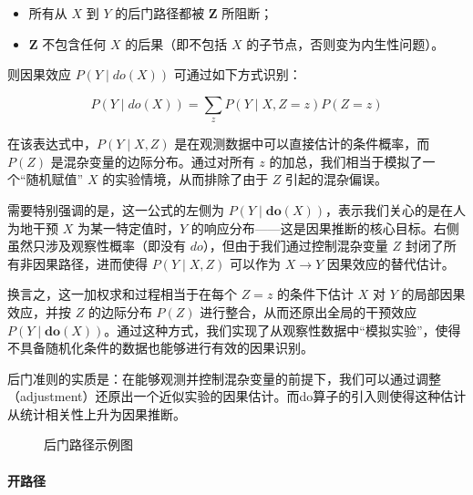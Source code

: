 \begin{itemize}
	\item 所有从 $X$ 到 $Y$ 的后门路径都被 $\mathbf{Z}$ 所阻断；
	\item $\mathbf{Z}$ 不包含任何 $X$ 的后果（即不包括 $X$ 的子节点，否则变为内生性问题）。
\end{itemize}

则因果效应 $P(Y \mid do(X))$ 可通过如下方式识别：

\begin{equation}
P(Y \mid do(X)) = \sum_{z} P(Y \mid X, Z = z) P(Z = z)
\end{equation}

在该表达式中，$P(Y \mid X, Z)$ 是在观测数据中可以直接估计的条件概率，而 $P(Z)$ 是混杂变量的边际分布。通过对所有 $z$ 的加总，我们相当于模拟了一个“随机赋值” $X$ 的实验情境，从而排除了由于 $Z$ 引起的混杂偏误。

需要特别强调的是，这一公式的左侧为 $P(Y \mid \mathbf{do}(X))$，表示我们关心的是在人为地干预 $X$ 为某一特定值时，$Y$ 的响应分布——这是因果推断的核心目标。右侧虽然只涉及观察性概率（即没有 $do$），但由于我们通过控制混杂变量 $Z$ 封闭了所有非因果路径，进而使得 $P(Y \mid X, Z)$ 可以作为 $X \rightarrow Y$ 因果效应的替代估计。

换言之，这一加权求和过程相当于在每个 $Z=z$ 的条件下估计 $X$ 对 $Y$ 的局部因果效应，并按 $Z$ 的边际分布 $P(Z)$ 进行整合，从而还原出全局的干预效应 $P(Y \mid \mathbf{do}(X))$。通过这种方式，我们实现了从观察性数据中“模拟实验”，使得不具备随机化条件的数据也能够进行有效的因果识别。

后门准则的实质是：在能够观测并控制混杂变量的前提下，我们可以通过调整（adjustment）还原出一个近似实验的因果估计。而do算子的引入则使得这种估计从统计相关性上升为因果推断。


\begin{figure}[ht]
	\centering
	\caption{后门路径示例图}
	\label{fig:wahaha3}
\end{figure}

\paragraph*{开路径}

